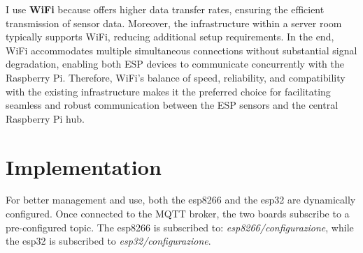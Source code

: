 \documentclass[]{scrartcl}
\begin{document}
\newpage
\noindent
I use \textbf{WiFi} because offers higher data transfer rates,  ensuring the efficient transmission of sensor data. Moreover, the infrastructure within a server room typically supports WiFi, reducing additional setup requirements. In the end, WiFi accommodates multiple simultaneous connections without substantial signal degradation, enabling both ESP devices to communicate concurrently with the Raspberry Pi.
\newline
Therefore, WiFi's balance of speed, reliability, and compatibility with the existing infrastructure makes it the preferred choice for facilitating seamless and robust communication between the ESP sensors and the central Raspberry Pi hub.
\section{Implementation}
For better management and use, both the esp8266 and the esp32 are dynamically configured. 
Once connected to the MQTT broker, the two boards subscribe to a pre-configured topic. The esp8266 is subscribed to: \textit{esp8266/configurazione}, while the esp32 is subscribed to \textit{esp32/configurazione}.
\end{document}
